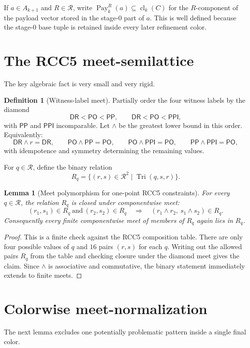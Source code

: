 \documentclass[11pt]{article}
\newtheorem{lemma}[theorem]{Lemma}
\theoremstyle{definition}
\newtheorem{definition}[theorem]{Definition}
\newcommand{\Roles}{\mathcal{R}}
\newcommand{\DR}{\mathsf{DR}}
\newcommand{\PO}{\mathsf{PO}}
\newcommand{\PP}{\mathsf{PP}}
\newcommand{\PPI}{\mathsf{PPI}}
\newcommand{\cld}[2]{\operatorname{cl}_{#1}(#2)}
\newcommand{\Tri}{\operatorname{Tri}}
\newcommand{\Pay}{\operatorname{Pay}}
\newcommand{\meet}{\mathbin{\wedge}}
\begin{document}
If $a\in A_{k+1}$ and $R\in\Roles$, write $\Pay^R_k(a)\subseteq\cld{k}{C}$ for the $R$-component of the payload vector stored in the stage-$0$ part of $a$. This is well defined because the stage-$0$ base tuple is retained inside every later refinement color.

\section{The RCC5 meet-semilattice}

The key algebraic fact is very small and very rigid.

\begin{definition}[Witness-label meet]
Partially order the four witness labels by the diamond
\[
\DR < \PO < \PP,
\qquad
\DR < \PO < \PPI,
\]
with $\PP$ and $\PPI$ incomparable. Let $\meet$ be the greatest lower bound in this order. Equivalently:
\[
\DR\meet r=\DR,
\qquad
\PO\meet\PP=\PO,
\qquad
\PO\meet\PPI=\PO,
\qquad
\PP\meet\PPI=\PO,
\]
with idempotence and symmetry determining the remaining values.
\end{definition}

For $q\in\Roles$, define the binary relation
\[
R_q=\{(r,s)\in\Roles^2\mid \Tri(q,s,r)\}.
\]

\begin{lemma}[Meet polymorphism for one-point RCC5 constraints]\label{lem:meetpoly}
For every $q\in\Roles$, the relation $R_q$ is closed under componentwise meet:
\[
(r_1,s_1)\in R_q\ \text{and}\ (r_2,s_2)\in R_q
\quad\Longrightarrow\quad
(r_1\meet r_2,\ s_1\meet s_2)\in R_q.
\]
Consequently every finite componentwise meet of members of $R_q$ again lies in $R_q$.
\end{lemma}

\begin{proof}
This is a finite check against the RCC5 composition table. There are only four possible values of $q$ and $16$ pairs $(r,s)$ for each $q$. Writing out the allowed pairs $R_q$ from the table and checking closure under the diamond meet gives the claim. Since $\meet$ is associative and commutative, the binary statement immediately extends to finite meets.
\end{proof}

\section{Colorwise meet-normalization}

The next lemma excludes one potentially problematic pattern inside a single final color.
\end{document}
